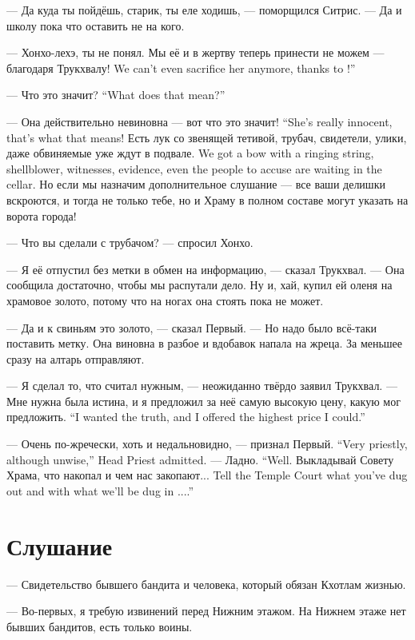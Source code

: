 --- Да куда ты пойдёшь, старик, ты еле ходишь, --- поморщился Ситрис.
--- Да и школу пока что оставить не на кого.

--- Хонхо-лехэ, ты не понял.
{Мы её и в жертву теперь принести не можем --- благодаря Трукхвалу!}
{We can't even sacrifice her anymore, thanks to \Trukchual!''}

{--- Что это значит?}
{``What does that mean?''}

{--- Она действительно невиновна --- вот что это значит!}
{``She's really innocent, that's what that means!}
{Есть лук со звенящей тетивой, трубач, свидетели, улики, даже обвиняемые уже ждут в подвале.}
{We got a bow with a ringing string, shellblower, witnesses, evidence, even the people to accuse are waiting in the cellar.}
Но если мы назначим дополнительное слушание --- все ваши делишки вскроются, и тогда не только тебе, но и Храму в полном составе могут указать на ворота города!

--- Что вы сделали с трубачом? --- спросил Хонхо.

--- Я её отпустил без метки в обмен на информацию, --- сказал Трукхвал.
--- Она сообщила достаточно, чтобы мы распутали дело.
Ну и, хай, купил ей оленя на храмовое золото, потому что на ногах она стоять пока не может.

--- Да и к свиньям это золото, --- сказал Первый.
--- Но надо было всё-таки поставить метку.
Она виновна в разбое и вдобавок напала на жреца.
За меньшее сразу на алтарь отправляют.

--- Я сделал то, что считал нужным, --- неожиданно твёрдо заявил Трукхвал.
{--- Мне нужна была истина, и я предложил за неё самую высокую цену, какую мог предложить.}
{``I wanted the truth, and I offered the highest price I could.''}

{--- Очень по-жречески, хоть и недальновидно, --- признал Первый.}
{``Very priestly, although unwise,'' Head Priest admitted.}
{--- Ладно.}
{``Well.}
{Выкладывай Совету Храма, что накопал и чем нас закопают...}
{Tell the Temple Court what you've dug out and with what we'll be dug in ....''}

\section{Слушание}

--- Свидетельство бывшего бандита и человека, который обязан Кхотлам жизнью.

--- Во-первых, я требую извинений перед Нижним этажом.
На Нижнем этаже нет бывших бандитов, есть только воины.

